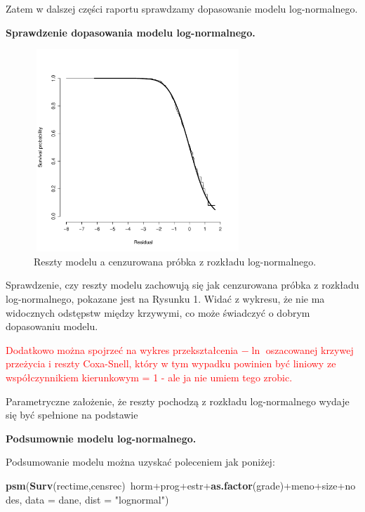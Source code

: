 \documentclass[]{article}
\newenvironment{Shaded}{}{}
\newcommand{\KeywordTok}[1]{\textcolor[rgb]{0.00,0.44,0.13}{\textbf{{#1}}}}
\newcommand{\DataTypeTok}[1]{\textcolor[rgb]{0.56,0.13,0.00}{{#1}}}
\newcommand{\StringTok}[1]{\textcolor[rgb]{0.25,0.44,0.63}{{#1}}}
\newcommand{\NormalTok}[1]{{#1}}
\begin{document}
Zatem w dalszej części raportu sprawdzamy dopasowanie modelu
log-normalnego.

\textbf{Sprawdzenie dopasowania modelu log-normalnego.}

\begin{figure}[hbt!]
  \vspace{-20pt}
  \begin{center}
     \includegraphics[width=0.7\textwidth, height=3in]{lognormal.pdf}
  \end{center}
  \vspace{-20pt}
  \label{fig:sc}
  \caption{Reszty modelu a cenzurowana próbka z rozkładu log-normalnego.}

\end{figure}

Sprawdzenie, czy reszty modelu zachowują się jak cenzurowana próbka z
rozkładu log-normalnego, pokazane jest na Rysunku 1. Widać z wykresu, że
nie ma widocznych odstępstw między krzywymi, co może świadczyć o dobrym
dopasowaniu modelu.

\textcolor{red}{Dodatkowo można spojrzeć na wykres przekształcenia $-\ln$ oszacowanej krzywej przeżycia i reszty Coxa-Snell, który w tym wypadku powinien być liniowy ze współczynnikiem kierunkowym = 1 - ale ja nie umiem tego zrobic.}

Parametryczne założenie, że reszty pochodzą z rozkładu log-normalnego
wydaje się być spełnione na podstawie 

\textbf{ Podsumownie modelu log-normalnego.}

Podsumowanie modelu można uzyskać poleceniem jak poniżej:

\begin{Shaded}
\begin{Highlighting}[]
\KeywordTok{psm}\NormalTok{(}\KeywordTok{Surv}\NormalTok{(rectime,censrec)~horm+prog+estr+}\KeywordTok{as.factor}\NormalTok{(grade)+meno+size+nodes, }
        \DataTypeTok{data =} \NormalTok{dane, }\DataTypeTok{dist =} \StringTok{"lognormal"}\NormalTok{)}
\end{Highlighting}
\end{Shaded}
\end{document}
